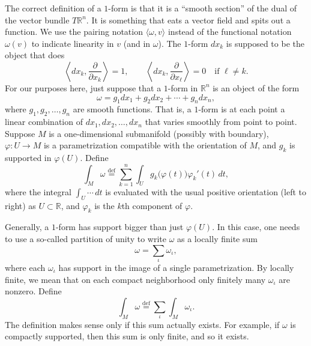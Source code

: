 \documentclass[12pt,openany]{book}
\newcommand{\R}{{\mathbb{R}}}
\theoremstyle{plain}
\theoremstyle{remark}
\theoremstyle{definition}
\theoremstyle{exercise}
\theoremstyle{example}
\begin{document}
The correct definition of a $1$-form is that it is a ``smooth section'' of
the dual of the vector bundle $T \R^n$.
It is something that eats
a vector field and spits out a function.
We use the pairing notation $\langle \omega , v \rangle$
%
instead of the functional
notation $\omega(v)$ to indicate linearity in $v$ (and in $\omega$).
The $1$-form
$dx_k$ is supposed to be the object that does
\begin{equation*}
\left\langle
dx_k,
\frac{\partial}{\partial x_k}
\right\rangle
=
1,
\qquad
\left\langle
dx_k ,
\frac{\partial}{\partial x_\ell}
\right\rangle
=
0 \quad \text{if $\ell \neq k$}.
\end{equation*}
For our purposes here, just suppose that a $1$-form
in $\R^n$ is an object of the form
\begin{equation*}
\omega = g_1 dx_1 + g_2 dx_2 + \cdots + g_n dx_n ,
\end{equation*}
where $g_1, g_2, \ldots, g_n$ are smooth functions.  That is, a $1$-form is
at each point a linear combination of $dx_1, dx_2, \ldots, dx_n$ that
varies smoothly from point to point.
Suppose $M$ is a one-dimensional submanifold
(possibly with boundary), $\varphi \colon U \to M$
is a parametrization compatible with the orientation of $M$,
and $g_k$ is supported in $\varphi(U)$.
Define
\begin{equation*}
\int_M \omega
\overset{\text{def}}{=}
\sum_{k=1}^n
\int_U g_k\bigl( \varphi(t) \bigr) \varphi_k'(t) \, dt ,
\end{equation*}
where the integral $\int_U \cdots \, dt$
is evaluated with the usual positive orientation
(left to right) as $U \subset \R$, and $\varphi_k$ is the $k$th component
of $\varphi$.

Generally, a $1$-form has support bigger than just $\varphi(U)$.  In this
case, one needs to use a so-called partition of unity to write $\omega$
as a locally finite sum
\begin{equation*}
\omega = \sum_{\iota} \omega_\iota ,
\end{equation*}
where each $\omega_\iota$ has support in the image of a single
parametrization.  By locally finite, we mean that on each compact
neighborhood only finitely many $\omega_\iota$ are nonzero.
Define
\begin{equation*}
\int_M \omega
\overset{\text{def}}{=}
\sum_{\iota}
\int_M \omega_\iota .
\end{equation*}
The definition makes sense only
if this sum actually exists.  For example, if $\omega$ is
compactly supported, then this sum is only finite, and so it exists.
\end{document}
